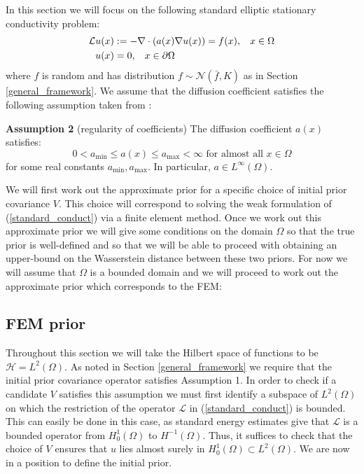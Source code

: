 In this section we will focus on the following standard elliptic stationary conductivity problem:
\begin{align}
    \label{standard_conduct}
    \begin{split}
        \mathcal{L}u(x) &:= -\nabla\cdot(a(x)\nabla u(x))=f(x), \hspace{0.3cm} x\in\Omega \\
        u(x) &= 0, \hspace{0.3cm} x\in\partial\Omega
    \end{split}
\end{align}
where $f$ is random and has distribution $f\sim\mathcal{N}(\bar{f},K)$ as in Section \textcolor{blue}{\ref{general_framework}}. We assume that the diffusion coefficient satisfies the following assumption taken from \textcolor{blue}{\cite{lord2014introduction}}:

\noindent \textbf{Assumption 2} (regularity of coefficients) The diffusion coefficient $a(x)$ satisfies:
\begin{equation}
    \label{regularity_of_coeff}
    0<a_{\text{min}}\leq a(x)\leq a_{\text{max}}<\infty \text{ for almost all } x\in\Omega
\end{equation}
for some real constants $a_{\text{min}},a_{\text{max}}$. In particular, $a\in L^{\infty}(\Omega)$.

We will first work out the approximate prior for a specific choice of initial prior covariance $V$. This choice will correspond to solving the weak formulation of (\ref{standard_conduct}) via a finite element method. Once we work out this approximate prior we will give some conditions on the domain $\Omega$ so that the true prior is well-defined and so that we will be able to proceed with obtaining an upper-bound on the Wasserstein distance between these two priors. For now we will assume that $\Omega$ is a bounded domain and we will proceed to work out the approximate prior which corresponds to the FEM:

\subsection{FEM prior}

Throughout this section we will take the Hilbert space of functions to be $\mathcal{H}=L^{2}(\Omega)$. As noted in Section \textcolor{blue}{\ref{general_framework}} we require that the initial prior covariance operator satisfies Assumption 1. In order to check if a candidate $V$ satisfies this assumption we must first identify a subspace of $L^{2}(\Omega)$ on which the restriction of the operator $\mathcal{L}$ in (\ref{standard_conduct}) is bounded. This can easily be done in this case, as standard energy estimates give that $\mathcal{L}$ is a bounded operator from $H^{1}_{0}(\Omega)$ to $H^{-1}(\Omega)$. Thus, it suffices to check that the choice of $V$ ensures that $u$ lies almost surely in $H_{0}^{1}(\Omega)\subset L^{2}(\Omega)$. We are now in a position to define the initial prior.

